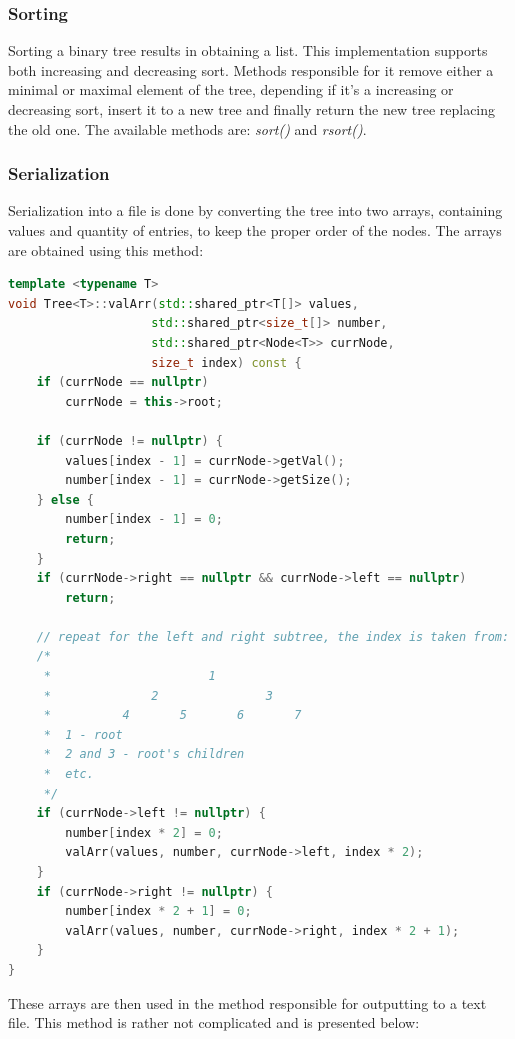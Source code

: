 \documentclass[12pt]{article}
\begin{document}
\subsubsection{Sorting}
Sorting a binary tree results in obtaining a list. This implementation supports both increasing and decreasing sort. Methods responsible for it remove either a minimal or maximal element of the tree, depending if it's a increasing or decreasing sort, insert it to a new tree and finally return the new tree replacing the old one. The available methods are: \textit{sort()} and \textit{rsort()}.

\pagebreak
\subsubsection{Serialization}
Serialization into a file is done by converting the tree into two arrays, containing values and quantity of entries, to keep the proper order of the nodes. The arrays are obtained using this method:
\begin{footnotesize}
\begin{lstlisting}[language=C++]
template <typename T>
void Tree<T>::valArr(std::shared_ptr<T[]> values, 
                    std::shared_ptr<size_t[]> number, 
                    std::shared_ptr<Node<T>> currNode, 
                    size_t index) const {
    if (currNode == nullptr)
        currNode = this->root;

    if (currNode != nullptr) { 
        values[index - 1] = currNode->getVal();
        number[index - 1] = currNode->getSize();
    } else {
        number[index - 1] = 0;
        return;
    }
    if (currNode->right == nullptr && currNode->left == nullptr)
        return;

    // repeat for the left and right subtree, the index is taken from:
    /*
     *                      1
     *              2               3
     *          4       5       6       7
     *  1 - root
     *  2 and 3 - root's children
     *  etc.
     */
    if (currNode->left != nullptr) {
        number[index * 2] = 0;
        valArr(values, number, currNode->left, index * 2);
    }
    if (currNode->right != nullptr) {
        number[index * 2 + 1] = 0;
        valArr(values, number, currNode->right, index * 2 + 1);
    }
}
\end{lstlisting}
\end{footnotesize}

\pagebreak
These arrays are then used in the method responsible for outputting to a text file. This method is rather not complicated and is presented below:
\end{document}
